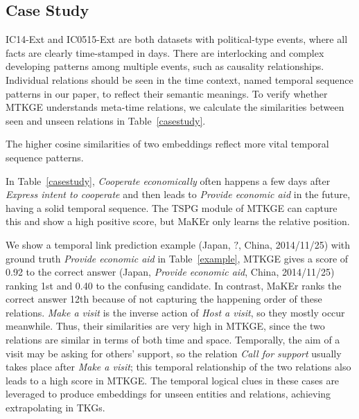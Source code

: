 \documentclass[sigconf]{acmart}
\begin{document}
\subsection{Case Study} 
\par
IC14-Ext and IC0515-Ext are both datasets with political-type events, where all facts are clearly time-stamped in days. There are interlocking and complex developing patterns among multiple events, such as causality relationships. Individual relations should be seen in the time context, named temporal sequence patterns in our paper, to reflect their semantic meanings. To verify whether MTKGE understands meta-time relations, we calculate the similarities between seen and unseen relations in Table~\ref{casestudy}. 

The higher cosine similarities of two embeddings reflect more vital temporal sequence patterns. 
\par
In Table~\ref{casestudy}, 
\emph{Cooperate economically} often happens a few days after
\emph{Express intent to cooperate} and then leads to \emph{Provide economic aid} in the future, having a solid temporal sequence. The TSPG module of MTKGE can capture this and show a high positive score, but MaKEr only learns the relative position. 

We show a temporal link prediction example (Japan, $?$, China, 2014/11/25) with ground truth \emph{Provide economic aid} in Table~\ref{example}, MTKGE gives a score of 0.92 to the correct answer (Japan, \emph{Provide economic aid}, China, 2014/11/25) ranking 1st and 0.40 to the confusing candidate. In contrast, MaKEr ranks the correct answer 12th because of not capturing the happening order of these relations.
\emph{Make a visit} is the inverse action of \emph{Host a visit}, so they mostly occur meanwhile. Thus, their similarities are very high in MTKGE, since the two relations are similar in terms of both time and space. Temporally, the aim of a visit may be asking for others' support, so the relation \emph{Call for support} usually takes place after \emph{Make a visit}; this temporal relationship of the two relations also leads to a high score in MTKGE. The temporal logical clues in these cases are leveraged to produce embeddings for unseen entities and relations, achieving extrapolating in TKGs.
\end{document}
